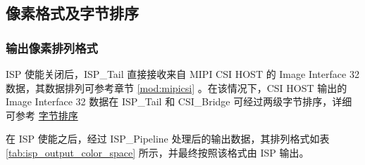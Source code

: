 \documentclass[main\_\_CN.tex]{subfiles}
\begin{document}
\subsection{像素格式及字节排序}
\subsubsection{输出像素排列格式}
ISP 使能关闭后，ISP\_Tail 直接接收来自 MIPI CSI HOST 的 Image Interface 32 数据，其数据排列可参考章节 \ref{mod:mipicsi} \textit{}。在该情况下，CSI HOST 输出的 Image Interface 32 数据在 ISP\_Tail 和 CSI\_Bridge 可经过两级字节排序，详细可参考 \hyperref[sec:isp_byte_order]{字节排序}

在 ISP 使能之后，经过 ISP\_Pipeline 处理后的输出数据，其排列格式如表 \ref{tab:isp_output_color_space} 所示，并最终按照该格式由 ISP 输出。
\end{document}
